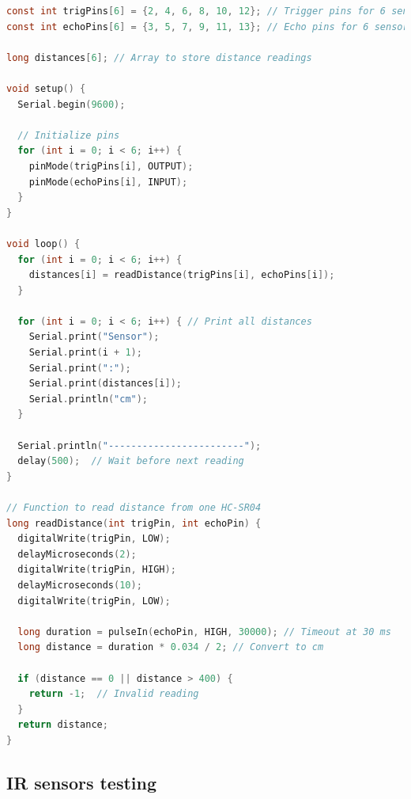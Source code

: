 \documentclass{article}
\begin{document}
\begin{lstlisting}[language=C, basicstyle=\ttfamily\footnotesize, frame=single, xleftmargin=10mm, xrightmargin=10mm]
const int trigPins[6] = {2, 4, 6, 8, 10, 12}; // Trigger pins for 6 sensors
const int echoPins[6] = {3, 5, 7, 9, 11, 13}; // Echo pins for 6 sensors

long distances[6]; // Array to store distance readings

void setup() {
  Serial.begin(9600);

  // Initialize pins
  for (int i = 0; i < 6; i++) {
    pinMode(trigPins[i], OUTPUT);
    pinMode(echoPins[i], INPUT);
  }
}

void loop() {
  for (int i = 0; i < 6; i++) {
    distances[i] = readDistance(trigPins[i], echoPins[i]);
  }

  for (int i = 0; i < 6; i++) { // Print all distances
    Serial.print("Sensor");
    Serial.print(i + 1);
    Serial.print(":");
    Serial.print(distances[i]);
    Serial.println("cm");
  }

  Serial.println("------------------------");
  delay(500);  // Wait before next reading
}

// Function to read distance from one HC-SR04
long readDistance(int trigPin, int echoPin) {
  digitalWrite(trigPin, LOW);
  delayMicroseconds(2);
  digitalWrite(trigPin, HIGH);
  delayMicroseconds(10);
  digitalWrite(trigPin, LOW);

  long duration = pulseIn(echoPin, HIGH, 30000); // Timeout at 30 ms
  long distance = duration * 0.034 / 2; // Convert to cm
  
  if (distance == 0 || distance > 400) {
    return -1;  // Invalid reading
  }
  return distance;
}
\end{lstlisting}

\newpage
\subsection{IR sensors testing}
\end{document}

